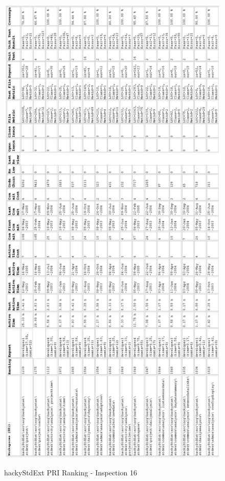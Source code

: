 \begin{figure}[htb]
  \centering
  \caption{hackyStdExt PRI Ranking - Inspection 16}
  \includegraphics[totalheight=1.0\textheight]{figs/Results/16_2005-05-25-hackyStdExt-printable.eps}
  \label{fig:inspection16-hackyStdExt-ranking}
\end{figure}




